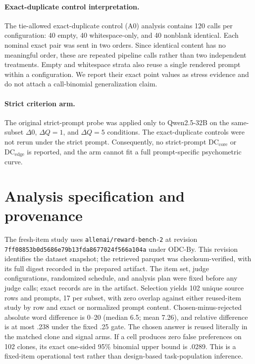 \documentclass[10pt]{article}
\newcommand{\DCcore}{\ensuremath{\mathrm{DC}_{\mathrm{core}}}}
\newcommand{\DCedge}{\ensuremath{\mathrm{DC}_{\mathrm{edge}}}}
\begin{document}
\paragraph{Exact-duplicate control interpretation.}
The tie-allowed exact-duplicate control (A0) analysis contains 120 calls per configuration: 40 empty, 40 whitespace-only, and 40 nonblank identical. Each nominal exact pair was sent in two orders. Since identical content has no meaningful order, these are repeated pipeline calls rather than two independent treatments. Empty and whitespace strata also reuse a single rendered prompt within a configuration. We report their exact point values as stress evidence and do not attach a call-binomial generalization claim.

\paragraph{Strict criterion arm.}
The original strict-prompt probe was applied only to Qwen2.5-32B on the same-subset $\Delta0$, $\Delta Q=1$, and $\Delta Q=5$ conditions. The exact-duplicate controls were not rerun under the strict prompt. Consequently, no strict-prompt \DCcore{} or \DCedge{} is reported, and the arm cannot fit a full prompt-specific psychometric curve.

\section{Analysis specification and provenance}

The fresh-item study uses \texttt{allenai/reward-bench-2} at revision \texttt{7ff08853\allowbreak b0d5686e\allowbreak79b13fda\allowbreak8677024f\allowbreak566a104a} under ODC-By. This revision identifies the dataset snapshot; the retrieved parquet was checksum-verified, with its full digest recorded in the prepared artifact. The item set, judge configurations, randomized schedule, and analysis plan were fixed before any judge calls; exact records are in the artifact. Selection yields 102 unique source rows and prompts, 17 per subset, with zero overlap against either reused-item study by row and exact or normalized prompt content. Chosen-minus-rejected absolute word difference is 0--20 (median 6.5; mean 7.26), and relative difference is at most .238 under the fixed .25 gate. The chosen answer is reused literally in the matched clone and signal arms. If a cell produces zero false preferences on 102 clones, its exact one-sided 95\% binomial upper bound is .0289. This is a fixed-item operational test rather than design-based task-population inference.
\end{document}
